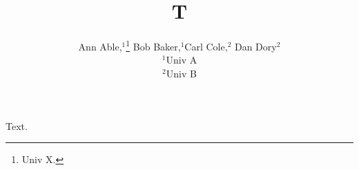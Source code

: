 \documentclass{article}
\newcommand*\samethanks[1][\value{footnote}]{\footnotemark[#1]}
\begin{document}
\title{T}
\author{Ann Able,$^{1}$\thanks{Univ X.} Bob Baker,$^{1}$\samethanks[1] Carl Cole,$^{2}$\footnotemark{} Dan Dory$^{2}$\footnotemark\\
$^{1}$Univ A\\ $^{2}$Univ B}
\maketitle
Text.
\end{document}
